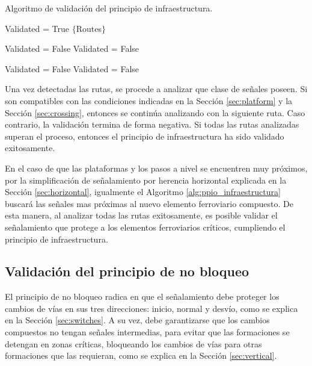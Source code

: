 		\begin{algorithm}[hbt!]
			\caption{Algoritmo de validación del principio de infraestructura.}\label{alg:ppio_infraestructura}
			\DontPrintSemicolon
			\SetNoFillComment
			\LinesNotNumbered 
			Validated = True\;
			$\{$Routes$\}$\; 
			{
				{
					{
						Validated = False\;
					}
					{
						Validated = False\;
					}
				}
				
				{
					{
						Validated = False\;
					}
					{
						Validated = False\;
					}
				}
			}
			
		\end{algorithm}
		
		Una vez detectadas las rutas, se procede a analizar que clase de señales poseen.  Si son compatibles con las condiciones indicadas en la Sección \ref{sec:platform} y la Sección \ref{sec:crossing}, entonces se continúa analizando con la siguiente ruta. Caso contrario, la validación termina de forma negativa. Si todas las rutas analizadas superan el proceso, entonces el principio de infraestructura ha sido validado exitosamente.
		
		En el caso de que las plataformas y los pasos a nivel se encuentren muy próximos, por la simplificación de señalamiento por herencia horizontal explicada en la Sección \ref{sec:horizontal}, igualmente el Algoritmo \ref{alg:ppio_infraestructura} buscará las señales mas próximas al nuevo elemento ferroviario compuesto. De esta manera, al analizar todas las rutas exitosamente, es posible validar el señalamiento que protege a los elementos ferroviarios críticos, cumpliendo el principio de infraestructura.
		
	\subsection{Validación del principio de no bloqueo}
		
		El principio de no bloqueo radica en que el señalamiento debe proteger los cambios de vías en sus tres direcciones: inicio, normal y desvío, como se explica en la Sección \ref{sec:switches}. A su vez, debe garantizarse que los cambios compuestos no tengan señales intermedias, para evitar que las formaciones se detengan en zonas críticas, bloqueando los cambios de vías para otras formaciones que las requieran, como se explica en la Sección \ref{sec:vertical}.
		
